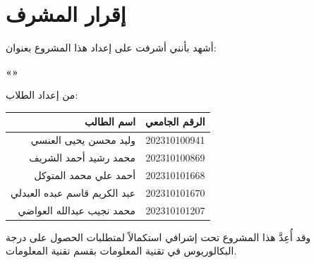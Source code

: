 \chapter*{إقرار المشرف}

أشهد بأنني أشرفت على إعداد هذا المشروع بعنوان:

\begin{center}
\large\bfseries\color{kauprimary}
«\thesisTitleAR»
\end{center}

من إعداد الطلاب:

\vspace{6pt}

\begin{center}
\begin{tabular}{|r|c|}
\hline
\textbf{اسم الطالب} & \textbf{الرقم الجامعي} \\
\hline
وليد محسن يحيى العنسي & 202310100941 \\
\hline
محمد رشيد أحمد الشريف & 202310100869 \\
\hline
أحمد علي محمد المتوكل & 202310101668 \\
\hline
عبد الكريم قاسم عبده العبدلي & 202310101670 \\
\hline
محمد نجيب عبدالله العواضي & 202310101207 \\
\hline
\end{tabular}
\end{center}

\vspace{6pt}

وقد أُعِدَّ هذا المشروع تحت إشرافي استكمالاً لمتطلبات الحصول على درجة
البكالوريوس في تقنية المعلومات بقسم تقنية المعلومات.

\vspace{24pt}

